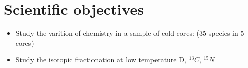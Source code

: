 \section{Scientific objectives}
\begin{itemize}
\item{Study the varition of chemistry in a sample of cold cores: (35 species in 5 cores)}
\item{Study the isotopic fractionation at low temperature D, $^{13}C$, $^{15}N$}
\end{itemize}
  
  